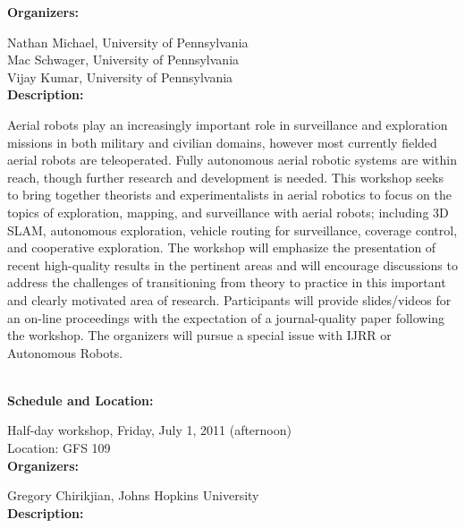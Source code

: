 {{\bf  Organizers:}

Nathan Michael, University of Pennsylvania\\
Mac Schwager, University of Pennsylvania\\
 Vijay Kumar, University of Pennsylvania\\[4mm]

{\bf Description: }


Aerial robots play an increasingly important role in surveillance and exploration missions in both military and civilian domains, however most currently fielded aerial robots are teleoperated. Fully autonomous aerial robotic systems are within reach, though further research and development is needed. This workshop seeks to bring together theorists and experimentalists in aerial robotics to focus on the topics of exploration, mapping, and surveillance with aerial robots; including 3D SLAM, autonomous exploration, vehicle routing for surveillance, coverage control, and cooperative exploration. The workshop will emphasize the presentation of recent high-quality results in the pertinent areas and will encourage discussions to address the challenges of transitioning from theory to practice in this important and clearly motivated area of research. Participants will provide slides/videos for an on-line proceedings with the expectation of a journal-quality paper following the workshop. The organizers will pursue a special issue with IJRR or Autonomous Robots.



\\[5mm]

{\bf  Schedule and Location:}

Half-day workshop, Friday, July 1, 2011 (afternoon)\\
Location: GFS 109 \\[4mm]

{\bf  Organizers:}

Gregory Chirikjian, Johns Hopkins University\\[4mm]

{\bf Description: }


}
